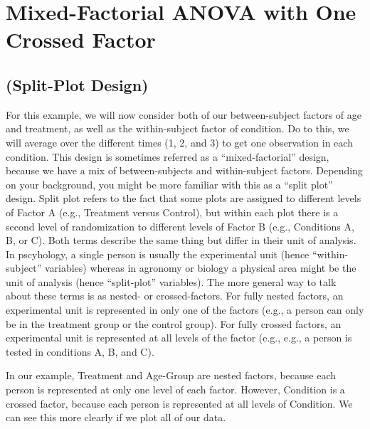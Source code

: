 \documentclass[]{article}
\begin{document}
\hypertarget{mixed-factorial-anova-with-one-crossed-factor}{%
\section{Mixed-Factorial ANOVA with One Crossed
Factor}\label{mixed-factorial-anova-with-one-crossed-factor}}

\hypertarget{split-plot-design}{%
\subsection{(Split-Plot Design)}\label{split-plot-design}}

For this example, we will now consider both of our between-subject
factors of age and treatment, as well as the within-subject factor of
condition. Do to this, we will average over the different times (1, 2,
and 3) to get one observation in each condition. This design is
sometimes referred as a ``mixed-factorial'' design, because we have a
mix of between-subjects and within-subject factors. Depending on your
background, you might be more familiar with this as a ``split plot''
design. Split plot refers to the fact that some plots are assigned to
different levels of Factor A (e.g., Treatment versus Control), but
within each plot there is a second level of randomization to different
levels of Factor B (e.g., Conditions A, B, or C). Both terms describe
the same thing but differ in their unit of analysis. In pscyhology, a
single person is usually the experimental unit (hence ``within-subject''
variables) whereas in agronomy or biology a physical area might be the
unit of analysis (hence ``split-plot'' variables). The more general way
to talk about these terms is as nested- or crossed-factors. For fully
nested factors, an experimental unit is represented in only one of the
factors (e.g., a person can only be in the treatment group or the
control group). For fully crossed factors, an experimental unit is
represented at all levels of the factor (e.g., e.g., a person is tested
in conditions A, B, and C).

In our example, Treatment and Age-Group are nested factors, because each
person is represented at only one level of each factor. However,
Condition is a crossed factor, because each person is represented at all
levels of Condition. We can see this more clearly if we plot all of our
data.
\end{document}
